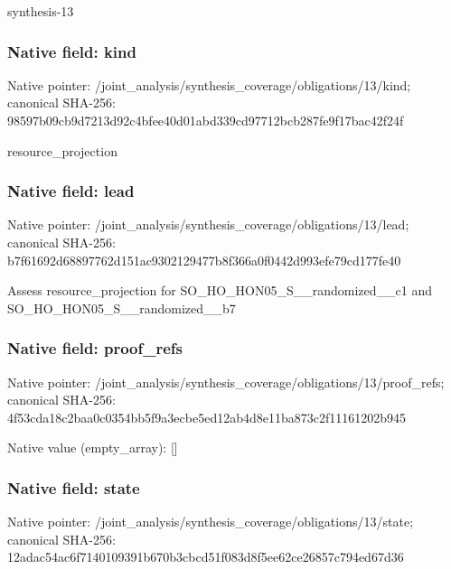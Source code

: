 \documentclass[10pt,a4paper]{article}
\begin{document}
\begingroup\raggedright\sloppy synthesis-13\par\endgroup

\subsubsection{Native field: kind}
Native pointer: /joint\_\allowbreak{}analysis/synthesis\_\allowbreak{}coverage/obligations/13/kind; canonical SHA-256: 98597b09cb9d7213d92c4bfee40d01abd339cd97712bcb287fe9f17bac42f24f

\begingroup\raggedright\sloppy resource\_\allowbreak{}projection\par\endgroup

\subsubsection{Native field: lead}
Native pointer: /joint\_\allowbreak{}analysis/synthesis\_\allowbreak{}coverage/obligations/13/lead; canonical SHA-256: b7f61692d68897762d151ac9302129477b8f366a0f0442d993efe79cd177fe40

\begingroup\raggedright\sloppy Assess resource\_\allowbreak{}projection for SO\_\allowbreak{}HO\_\allowbreak{}HON05\_\allowbreak{}S\_\allowbreak{}\_\allowbreak{}randomized\_\allowbreak{}\_\allowbreak{}c1 and SO\_\allowbreak{}HO\_\allowbreak{}HON05\_\allowbreak{}S\_\allowbreak{}\_\allowbreak{}randomized\_\allowbreak{}\_\allowbreak{}b7\par\endgroup

\subsubsection{Native field: proof\_\allowbreak{}refs}
Native pointer: /joint\_\allowbreak{}analysis/synthesis\_\allowbreak{}coverage/obligations/13/proof\_\allowbreak{}refs; canonical SHA-256: 4f53cda18c2baa0c0354bb5f9a3ecbe5ed12ab4d8e11ba873c2f11161202b945

Native value (empty\_\allowbreak{}array): []

\subsubsection{Native field: state}
Native pointer: /joint\_\allowbreak{}analysis/synthesis\_\allowbreak{}coverage/obligations/13/state; canonical SHA-256: 12adac54ac6f7140109391b670b3cbcd51f083d8f5ee62ce26857c794ed67d36
\end{document}
